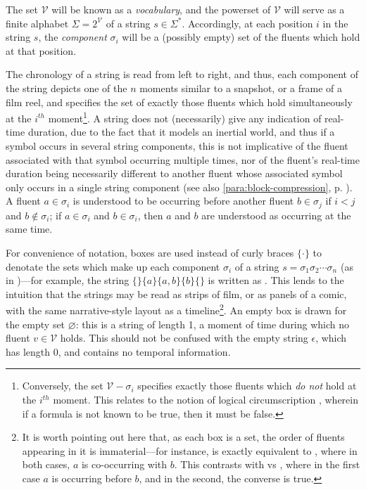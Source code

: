 \documentclass[a4paper,12pt,leqno]{article}
\newcommand{\vph}[1]{\vphantom{#1}}
\newcommand{\ebox}[1]{\fbox{$\vph{'(),}#1$}}
\newcommand{\V}{\mathcal{V}}
\renewcommand{\emptyset}{\varnothing}
\newcommand{\EventString}[1]{%
	\renewcommand*{\do}[1]{\ebox{##1}}%
	\PipeParser{#1}%
}
\newcommand{\selfnote}[1]{{\color{red}[NB\footnote{{\color{red}#1}}]}}
\newcommand{\nb}{\selfnote}
\begin{document}
The set $\V$ will be known as a \textit{vocabulary}, and the powerset of $\V$ will serve as a finite alphabet $\Sigma = 2^{\V}$ of a string $s \in \Sigma^*$. Accordingly, at each position $i$ in the string $s$, the \textit{component} $\sigma_i$ will be a (possibly empty) set of the fluents which hold at that position.

The chronology of a string is read from left to right, and thus, each component of the string depicts one of the $n$ moments similar to a snapshot, or a frame of a film reel, and specifies the set of exactly those fluents which hold simultaneously at the $i^{th}$ moment\footnote{Conversely, the set $\V-\sigma_i$ specifies exactly those fluents which \textit{do not} hold at the $i^{th}$ moment. This relates to the notion of logical circumscription \citep{mccarthy1980circumscription}, wherein if a formula is not known to be true, then it must be false.}. A string does not (necessarily) give any indication of real-time duration, due to the fact that it models an inertial world, and thus if a symbol occurs in several string components, this is not implicative of the fluent associated with that symbol occurring multiple times, nor of the fluent's real-time duration being necessarily different to another fluent whose associated symbol only occurs in a single string component (see also \cref{para:block-compression}, p. \pageref{para:block-compression}). A fluent $a \in \sigma_i$ is understood to be occurring before another fluent $b \in \sigma_j$ if $i < j$ and $b \notin \sigma_i$; if $a \in \sigma_i$ and $b \in \sigma_i$, then $a$ and $b$ are understood as occurring at the same time.%

For convenience of notation, boxes \ebox{\cdot} are used instead of curly braces $\{\cdot\}$ to denotate the sets which make up each component $\sigma_i$ of a string $s = \sigma_1\sigma_2\cdots\sigma_n$ (as in \citet{Fernando2004,fernando2015semantics,fernando2016prior})---for example, the string $\{\}\{a\}\{a,b\}\{b\}\{\}$ is written as \EventString{{}|a|a,b|b|{}}. This lends to the intuition that the strings may be read as strips of film, or as panels of a comic, with the same narrative-style layout as a timeline\footnote{It is worth pointing out here that, as each box is a set, the order of fluents appearing in it is immaterial---for instance, \EventString{a,b} is exactly equivalent to \EventString{b,a}, where in both cases, $a$ is co-occurring with $b$. This contrasts with \EventString{a|b} vs \EventString{b|a}, where in the first case $a$ is occurring before $b$, and in the second, the converse is true.}. An empty box \ebox{} is drawn for the empty set $\emptyset$: this is a string of length 1, a moment of time during which no fluent $v \in \V$ holds. This should not be confused with the empty string $\epsilon$, which has length 0, and contains no temporal information.
\end{document}
